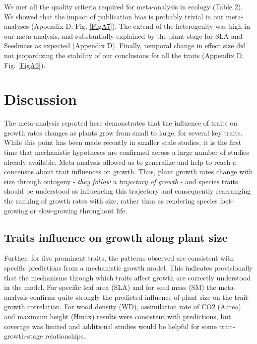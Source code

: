 \documentclass[a4paper]{article}\usepackage[]{graphicx}\usepackage[]{color}
\begin{document}
We met all the quality criteria required for meta-analysis in ecology (Table 2). We showed that the impact of publication bias is probably trivial in our meta-analyses (Appendix D, Fig. \ref{FigA7}). The extend of the heterogenity was high in our meta-analysis, and substantially explained by the plant stage for SLA and Seedmass as expected (Appendix D). Finally, temporal change in effect size did not jeopardizing the stability of our conclusions for all the traits (Appendix D, Fig. \ref{FigA9}).


\section*{Discussion}\label{discussion}

The meta-analysis reported here demonstrates that the influence of traits on growth rates changes as plants grow from small to large, for several key traits. While this point has been made recently in smaller scale studies, it is the first time that mechanistic hypotheses are confirmed across a large number of studies already available. Meta-analysis allowed us to generalize and help to reach a concensus about trait influences on growth. Thus, plant growth rates change with size through ontogeny \citep{Condit:1993hd, Clark:1999ed, Herault:2011dd} - \textit{they follow a trajectory of growth} - and species traits should be understood as influencing this trajectory and consequently rearranging the ranking of growth rates with size, rather than as rendering species fast-growing or slow-growing throughout life. 

\subsection*{Traits influence on growth along plant size}

Further, for five prominent traits, the patterns observed are consistent with specific predictions from a mechanistic growth model. This indicates provisionally that the mechanisms through which traits affect growth are correctly understood in the model. For specific leaf area (SLA) and for seed mass (SM) the meta-analysis confirms quite strongly the predicted influence of plant size on the trait-growth correlation. For wood density (WD), assimilation rate of CO2 (Aarea) and maximum height (Hmax) results were consistent with predictions, but coverage was limited and additional studies would be helpful for some trait-growth-stage relationships. 
\end{document}
